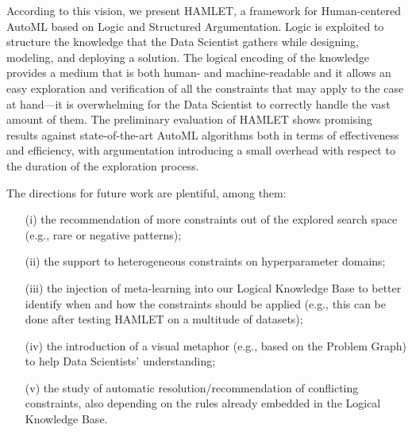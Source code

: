 According to this vision, we present HAMLET, a framework for Human-centered AutoML based on Logic and Structured Argumentation.
Logic is exploited to structure the knowledge that the Data Scientist gathers while designing, modeling, and deploying a solution.
The logical encoding of the knowledge provides a medium that is both human- and machine-readable and it allows an easy exploration and verification of all the constraints that may apply to the case at hand---it is overwhelming for the Data Scientist to correctly handle the vast amount of them.
The preliminary evaluation of HAMLET shows promising results against state-of-the-art AutoML algorithms both in terms of effectiveness and efficiency, with argumentation introducing a small overhead with respect to the duration of the exploration process.

The directions for future work are plentiful, among them:
\begin{itemize}
    \item[(i)] the recommendation of more constraints out of the explored search space (e.g., rare or negative patterns);
    \item[(ii)] the support to heterogeneous constraints on hyperparameter domains;
    \item[(iii)] the injection of meta-learning into our Logical Knowledge Base to better identify when and how the constraints should be applied (e.g., this can be done after testing HAMLET on a multitude of datasets);
    \item[(iv)] the introduction of a visual metaphor (e.g., based on the Problem Graph) to help Data Scientists' understanding;
    \item[(v)] the study of automatic resolution/recommendation of conflicting constraints, also depending on the rules already embedded in the Logical Knowledge Base.
\end{itemize}
